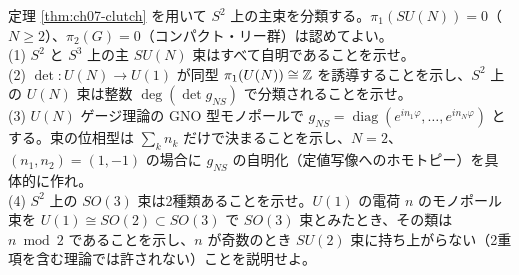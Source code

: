 \begin{problem}[難易度 C]\label{ch07-prob-s2bundles}
定理 \ref{thm:ch07-clutch} を用いて $S^2$ 上の主束を分類する。$\pi_1(SU(N))=0$（$N\ge2$）、$\pi_2(G)=0$（コンパクト・リー群）は認めてよい。\\
(1) $S^2$ と $S^3$ 上の主 $SU(N)$ 束はすべて自明であることを示せ。\\
(2) $\det\colon U(N)\to U(1)$ が同型 $\pi_1(U(N))\cong\mathbb{Z}$ を誘導することを示し、$S^2$ 上の $U(N)$ 束は整数 $\deg(\det g_{NS})$ で分類されることを示せ。\\
(3) $U(N)$ ゲージ理論の GNO 型モノポールで $g_{NS}=\operatorname{diag}(e^{in_1\varphi},\dots,e^{in_N\varphi})$ とする。束の位相型は $\sum_kn_k$ だけで決まることを示し、$N=2$、$(n_1,n_2)=(1,-1)$ の場合に $g_{NS}$ の自明化（定値写像へのホモトピー）を具体的に作れ。\\
(4) $S^2$ 上の $SO(3)$ 束は2種類あることを示せ。$U(1)$ の電荷 $n$ のモノポール束を $U(1)\cong SO(2)\subset SO(3)$ で $SO(3)$ 束とみたとき、その類は $n\bmod2$ であることを示し、$n$ が奇数のとき $SU(2)$ 束に持ち上がらない（2重項を含む理論では許されない）ことを説明せよ。
\end{problem}

